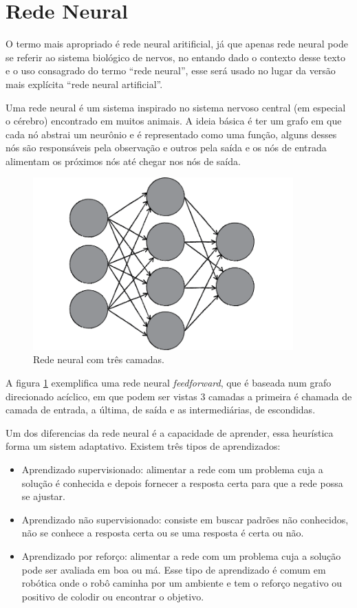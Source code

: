 \section{Rede Neural}

O termo mais apropriado é rede neural aritificial, já que apenas rede
neural pode se referir ao sistema biológico de nervos, no entando dado o
contexto desse texto e o uso consagrado do termo ``rede neural'', esse
será usado no lugar da versão mais explícita ``rede neural artificial''.

Uma rede neural é um sistema inspirado no sistema nervoso central (em
especial o cérebro) encontrado em muitos animais. A ideia básica é ter
um grafo em que cada nó abstrai um neurônio e é representado como uma
função, alguns desses nós são responsáveis pela observação e outros pela
saída e os nós de entrada alimentam os próximos nós até chegar nos nós
de saída. \cite{haykin2001redes}

\begin{figure}[H]
  \centering
  \includegraphics[width=10cm]{figuras/rede_neural_grafo}
  \caption{Rede neural com três camadas.}\label{fig:rede_neural_grafo}
\end{figure}

A figura \ref{fig:rede_neural_grafo} exemplifica uma rede neural \emph{feedforward},
que é baseada num grafo direcionado acíclico, em que podem ser vistas 3 camadas
a primeira é chamada de camada de entrada, a última, de saída e as intermediárias,
de escondidas. \cite{shiffman2012nature}

Um dos diferencias da rede neural é a capacidade de aprender, essa heurística
forma um sistem adaptativo. Existem três tipos de aprendizados:

\begin{itemize}
\item
  Aprendizado supervisionado: alimentar a rede com um problema cuja a solução é conhecida
  e depois fornecer a resposta certa para que a rede possa se ajustar.
\item
  Aprendizado não supervisionado: consiste em buscar padrões não conhecidos, não se conhece
  a resposta certa ou se uma resposta é certa ou não.
\item
  Aprendizado por reforço: alimentar a rede com um problema cuja a solução pode ser avaliada
  em boa ou má. Esse tipo de aprendizado é comum em robótica onde o robô caminha por um ambiente
  e tem o reforço negativo ou positivo de colodir ou encontrar o objetivo.
\end{itemize}

